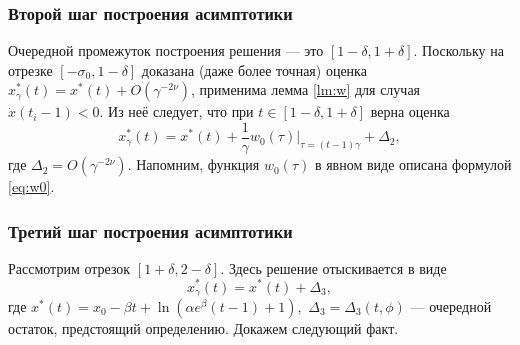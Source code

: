\subsubsection{Второй шаг построения асимптотики}
Очередной промежуток построения решения --- это $[1 - \delta, 1 + \delta]$. Поскольку на отрезке $[-\sigma_0, 1 - \delta]$ доказана (даже более точная) оценка $x^*_\gamma(t) = x^*(t) + O(\gamma^{-2\nu})$, применима лемма \ref{lm:w} для случая $\dot{x}(t_i - 1) < 0$. Из неё следует, что при $t \in [1 - \delta, 1 + \delta]$ верна оценка
\begin{equation}
	\label{eq:sol_2}
	x_{\gamma}^*(t) = x^*(t) + \frac{1}{\gamma} w_0(\tau)\bigg\vert_{\tau=(t - 1)\gamma} + \Delta_2,
\end{equation}
где $\Delta_2 = O(\gamma^{-2\nu})$. Напомним, функция $w_0(\tau)$ в явном виде описана формулой \ref{eq:w0}.

\subsubsection{Третий шаг построения асимптотики}
Рассмотрим отрезок $[1 + \delta, 2 - \delta]$. Здесь решение отыскивается в виде
\begin{equation}
	\label{eq:sol_3}
	x_\gamma^*(t) = x^*(t) + \Delta_3,
\end{equation}
где $x^*(t) = x_0 - \beta t +\ln(\alpha e^{\beta}(t - 1) + 1),$ $\Delta_3 = \Delta_3(t, \phi)$ --- очередной остаток, предстоящий определению. Докажем следующий факт.

